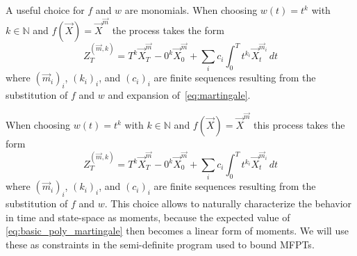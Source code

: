 A useful choice for $f$ and $w$ are monomials.
When choosing $w(t)=t^k$
with $k\in\mathbb N$ and $f(\vec X)={\vec X}^{\vec m}$
the process takes the form
\begin{equation}\label{eq:basic_poly_martingale_app}
  Z_T^{(\vec m, k)}=
  T^k \vec X_T^{\vec m}
  - 0^k \vec X_{0}^{\vec m}
  + \sum_{i}c_i\int_0^T t^{k_i} \vec X_t^{\vec m_i}\,dt
\end{equation}
where   $(\vec m_i)_i$, $(k_i)_i$, and $(c_i)_i$ are finite sequences resulting
from the substitution
of $f$ and $w$
and expansion of~\eqref{eq:martingale}.

When choosing $w(t)=t^k$ with $k\in\mathbb N$ and $f(\vec X)={\vec X}^{\vec m}$
this process takes the form
\begin{equation}\label{eq:basic_poly_martingale}
  Z_T^{(\vec m, k)}=
  T^k \vec X_T^{\vec m}
  - 0^k \vec X_{0}^{\vec m}
  + \sum_{i}c_i\int_0^T t^{k_i} \vec X_t^{\vec m_i}\,dt
\end{equation}
where   $(\vec m_i)_i$, $(k_i)_i$, and $(c_i)_i$ are finite sequences resulting
from the substitution
of $f$ and $w$.
This choice allows to naturally
characterize the behavior in time and state-space as moments, because
the expected value of \eqref{eq:basic_poly_martingale} then becomes a
linear form
of moments.
We will use these as constraints in the semi-definite program used to
bound \acp{MFPT}.

